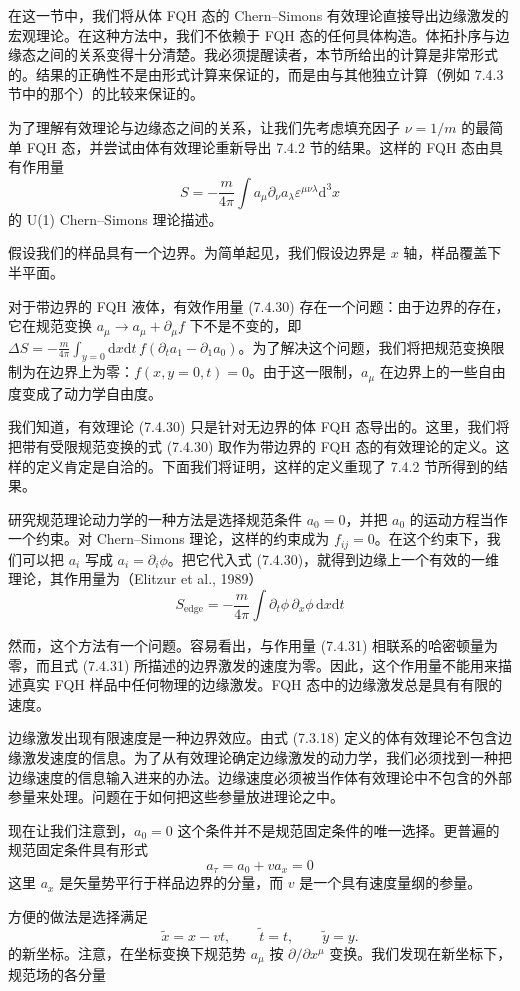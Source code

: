 在这一节中，我们将从体 FQH 态的 Chern--Simons 有效理论直接导出边缘激发的宏观理论。在这种方法中，我们不依赖于 FQH 态的任何具体构造。体拓扑序与边缘态之间的关系变得十分清楚。我必须提醒读者，本节所给出的计算是非常形式的。结果的正确性不是由形式计算来保证的，而是由与其他独立计算（例如 7.4.3 节中的那个）的比较来保证的。

为了理解有效理论与边缘态之间的关系，让我们先考虑填充因子 $\nu=1/m$ 的最简单 FQH 态，并尝试由体有效理论重新导出 7.4.2 节的结果。这样的 FQH 态由具有作用量
\begin{equation*}
S=-\frac{m}{4\pi}\int a_\mu\partial_\nu a_\lambda\varepsilon^{\mu\nu\lambda}\mathrm{d}^3x
\tag{7.4.30}
\end{equation*}
的 U(1) Chern--Simons 理论描述。

假设我们的样品具有一个边界。为简单起见，我们假设边界是 $x$ 轴，样品覆盖下半平面。

对于带边界的 FQH 液体，有效作用量 (7.4.30) 存在一个问题：由于边界的存在，它在规范变换 $a_\mu\to a_\mu+\partial_\mu f$ 下不是不变的，即 $\Delta S=-\frac{m}{4\pi}\int_{y=0}\mathrm{d}x\mathrm{d}t\,f(\partial_ta_1-\partial_1a_0)$。为了解决这个问题，我们将把规范变换限制为在边界上为零：$f(x,y=0,t)=0$。由于这一限制，$a_\mu$ 在边界上的一些自由度变成了动力学自由度。

我们知道，有效理论 (7.4.30) 只是针对无边界的体 FQH 态导出的。这里，我们将把带有受限规范变换的式 (7.4.30) 取作为带边界的 FQH 态的有效理论的定义。这样的定义肯定是自洽的。下面我们将证明，这样的定义重现了 7.4.2 节所得到的结果。

研究规范理论动力学的一种方法是选择规范条件 $a_0=0$，并把 $a_0$ 的运动方程当作一个约束。对 Chern--Simons 理论，这样的约束成为 $f_{ij}=0$。在这个约束下，我们可以把 $a_i$ 写成 $a_i=\partial_i\phi$。把它代入式 (7.4.30)，就得到边缘上一个有效的一维理论，其作用量为（Elitzur et al., 1989）
\begin{equation*}
S_{\text{edge}}=-\frac{m}{4\pi}\int\partial_t\phi\,\partial_x\phi\,\mathrm{d}x\mathrm{d}t
\tag{7.4.31}
\end{equation*}

然而，这个方法有一个问题。容易看出，与作用量 (7.4.31) 相联系的哈密顿量为零，而且式 (7.4.31) 所描述的边界激发的速度为零。因此，这个作用量不能用来描述真实 FQH 样品中任何物理的边缘激发。FQH 态中的边缘激发总是具有有限的速度。

边缘激发出现有限速度是一种边界效应。由式 (7.3.18) 定义的体有效理论不包含边缘激发速度的信息。为了从有效理论确定边缘激发的动力学，我们必须找到一种把边缘速度的信息输入进来的办法。边缘速度必须被当作体有效理论中不包含的外部参量来处理。问题在于如何把这些参量放进理论之中。

现在让我们注意到，$a_0=0$ 这个条件并不是规范固定条件的唯一选择。更普遍的规范固定条件具有形式
\begin{equation*}
a_\tau=a_0+va_x=0
\tag{7.4.32}
\end{equation*}
这里 $a_x$ 是矢量势平行于样品边界的分量，而 $v$ 是一个具有速度量纲的参量。

方便的做法是选择满足
\begin{equation*}
\tilde{x}=x-vt,\qquad \tilde{t}=t,\qquad \tilde{y}=y.
\tag{7.4.33}
\end{equation*}
的新坐标。注意，在坐标变换下规范势 $a_\mu$ 按 $\partial/\partial x^\mu$ 变换。我们发现在新坐标下，规范场的各分量
